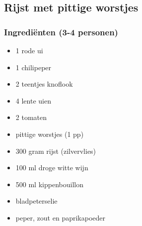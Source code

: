\subsection{Rijst met pittige worstjes}

\subsubsection*{Ingrediënten (3-4 personen)}
\begin{multicols}{2}
    \begin{itemize}
        \item 1 rode ui
        \item 1 chilipeper
        \item 2 teentjes knoflook
        \item 4 lente uien
        \item 2 tomaten
        \item pittige worstjes (1 pp)
        \item 300 gram rijst (zilvervlies)
        \item 100 ml droge witte wijn
        \item 500 ml kippenbouillon
        \item bladpeterselie
        \item peper, zout en paprikapoeder
    \end{itemize}
\end{multicols}

